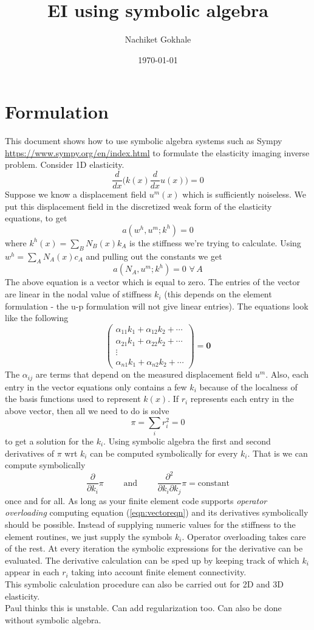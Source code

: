 \documentclass{article}
\newcommand{\beq}{\begin{equation}}
\newcommand{\eeq}{\end{equation}}
\newcommand{\dd}[1]{\frac{d}{d{#1}} }
\newcommand{\pdd}[1]{\frac{\partial}{\partial{#1}}}
\newcommand{\pddd}[2]{\frac{\partial^2}{\partial{#1}\partial{#2}}}
\begin{document}
\title{EI using symbolic algebra}
\author{Nachiket Gokhale}
\date{\today}
\maketitle
\section{Formulation}
This document shows how to use symbolic algebra systems such as Sympy \url{https://www.sympy.org/en/index.html} to formulate the elasticity imaging inverse problem. Consider 1D elasticity.
%
%
\beq
\dd{x}\Big(k(x)\dd{x}u(x)\Big) = 0
\eeq
%
%
Suppose we know a displacement field ${u}^m(x)$ which is sufficiently noiseless. We put this displacement field in the discretized weak form of the elasticity equations,  to get
%
%
\beq
a(w^h,u^m;k^h) = 0
\eeq
where $k^h(x)=\sum_{B}N_B(x)k_A$ is the stiffness we're trying to calculate. Using $w^h=\sum_{A}N_A(x)c_A$ and pulling out the constants we get
%
%
\beq
a(N_A,u^m;k^h) = 0  \,\, \forall \, A
\eeq
%
%
The above equation is a vector which is equal to zero. The entries of the vector are linear in the nodal value of stiffness $k_i$ (this depends on the element formulation - the u-p formulation will not give linear entries). The equations look like the following
%
%
\beq
\label{eqn:vectoreqn}
\begin{pmatrix}
  \alpha_{11}k_1 + \alpha_{12}k_2 + \cdots \\
  \alpha_{21}k_1 + \alpha_{22}k_2 + \cdots \\
  \vdots\\
  \alpha_{n1}k_1 + \alpha_{n2}k_2 + \cdots
\end{pmatrix}
=\pmb{0}
\eeq
%
%
The $\alpha_{ij}$ are terms that depend on the measured displacement field $u^m$. Also, each entry in the vector equations only contains a few $k_i$ because of the localness of the basis functions used to represent $k(x)$. If $r_i$ represents each entry in the above vector, then all we need to do is solve
%
%
\beq
\pi = \sum_{i}r_i^2 = 0
\eeq
to get a solution for the $k_i$. Using symbolic algebra the first and second derivatives of $\pi$ wrt $k_i$ can be computed symbolically for every $k_i$. That is we can compute symbolically
\beq
\pdd{k_i}\pi \qquad \text{ and } \qquad \pddd{k_i}{k_j}\pi = \text{constant}
\eeq
once and for all. As long as your finite element code supports \textit{operator overloading} computing equation (\ref{eqn:vectoreqn}) and its derivatives symbolically should be possible. Instead of supplying numeric values for the stiffness to the element routines, we just supply the symbols $k_i$. Operator overloading takes care of the rest. At every iteration the symbolic expressions for the derivative can be evaluated. The derivative calculation can be sped up by keeping track of which $k_i$ appear in each $r_i$ taking into account finite element connectivity.\\

This symbolic calculation procedure can also be carried out for 2D and 3D elasticity.\\
%
%
Paul thinks this is unstable. Can add regularization too. Can also be done without symbolic algebra.
\end{document}
